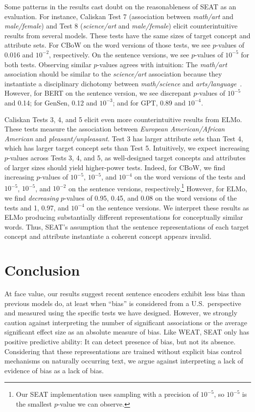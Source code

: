 \documentclass[11pt,a4paper]{article}
\begin{document}
Some patterns in the results cast doubt on the reasonableness of SEAT as an evaluation.
For instance, Caliskan Test 7 (association between \textit{math/art} and \textit{male/female}) and Test 8 (\textit{science/art} and \textit{male/female}) elicit counterintuitive results from several models.  These tests have the same sizes of target concept and attribute sets.  For CBoW on the word versions of those tests, we see $p$-values of 0.016 and $10^{-2}$, respectively. 
On the sentence versions, we see $p$-values of $10^{-5}$ for both tests.  
Observing similar $p$-values agrees with intuition: The \textit{math/art} association should be similar to the \textit{science/art} association because they instantiate a disciplinary dichotomy between \textit{math/science} and \textit{arts/language}~\cite{nosek2002math}.
However, for BERT on the sentence version, we see discrepant $p$-values of $10^{-5}$ and 0.14; for GenSen, 0.12 and $10^{-3}$; and for GPT, 0.89 and $10^{-4}$.

Caliskan Tests 3, 4, and 5 elicit even more counterintuitive results from ELMo.  
These tests measure the association between \textit{European American/African American} and \textit{pleasant/unpleasant}.  Test 3 has larger attribute sets than Test 4, which has larger target concept sets than Test 5.  
Intuitively, we expect increasing  $p$-values across Tests 3, 4, and 5, as well-designed target concepts and attributes of larger sizes should yield higher-power tests. 
Indeed, for CBoW, we find increasing $p$-values of $10^{-5}$, $10^{-5}$, and $10^{-4}$ on the word versions of the tests and $10^{-5}$, $10^{-5}$, and $10^{-2}$ on the sentence versions, respectively.\footnote{  
    Our SEAT implementation uses sampling with a precision of $10^{-5}$, so $10^{-5}$ is the smallest $p$-value we can observe.
}
However, for ELMo, we find \emph{decreasing} $p$-values of \num{0.95}, \num{0.45}, and \num{0.08} on the word versions of the tests and \num{1}, \num{0.97}, and $10^{-4}$ on the sentence versions.
We interpret these results as ELMo producing substantially different representations for conceptually similar words.  Thus, SEAT's assumption that the sentence representations of each target concept and attribute instantiate a coherent concept appears invalid.

\section{Conclusion}

At face value, our results suggest recent sentence encoders exhibit less bias than previous models do, at least when ``bias'' is considered from a U.S.\ perspective and measured using the specific tests we have designed.  However, we strongly caution against interpreting the number of significant associations or the average significant effect size as an absolute measure of bias.  Like WEAT, SEAT only has positive predictive ability:  It can detect presence of bias, but not its absence.  Considering that these representations are trained without explicit bias control mechanisms on naturally occurring text, we argue against interpreting a lack of evidence of bias as a lack of bias.
\end{document}
